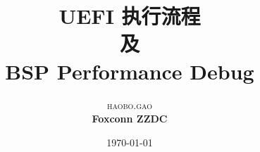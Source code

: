 \documentclass [a4paper,12pt,oneside] {report}
\begin{document}
\title{\textbf{UEFI 执行流程}\\ %
及 \\BSP Performance Debug} %

\author{\textsc{haobo.gao} %
\\{\textbf{Foxconn ZZDC}}} %

\date{\today} %
\maketitle


\tableofcontents
\newpage
{}



\end{document}
